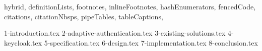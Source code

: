 \documentclass[
  digital,     %
  oneside,     %
  nosansbold,  %
  nocolorbold, %
  lof,         %
  nolot,         %
]{fithesis4}
\begin{document}
\shorthandoff{-}
\begin{markdown*}{%
  hybrid,
  definitionLists,
  footnotes,
  inlineFootnotes,
  hashEnumerators,
  fencedCode,
  citations,
  citationNbsps,
  pipeTables,
  tableCaptions,
}

{1-introduction.tex}
{2-adaptive-authentication.tex}
{3-existing-solutions.tex}
{4-keycloak.tex}
{5-specification.tex}
{6-design.tex}
{7-implementation.tex}
{8-conclusion.tex}

\end{markdown*}
\end{document}
